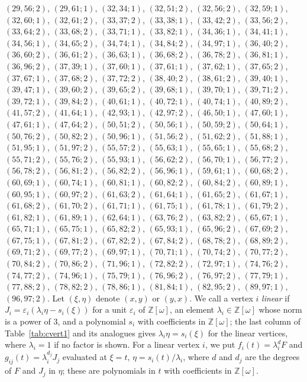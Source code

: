 \documentclass[11pt]{article}
\newcommand{\Z}{\mathbb{Z}}
\begin{document}
$(29,56;2)$, $(29,61;1)$, $(32,34;1)$, $(32,51;2)$, $(32,56;2)$, $(32,59;1)$, $(32,60;1)$, $(32,61;2)$, $(33,37;2)$, $(33,38;1)$, $(33,42;2)$, $(33,56;2)$, $(33,64;2)$, $(33,68;2)$, $(33,71;1)$, $(33,82;1)$, $(34,36;1)$, $(34,41;1)$, $(34,56;1)$, $(34,65;2)$, $(34,74;1)$, $(34,84;2)$, $(34,97;1)$, $(36,40;2)$, $(36,60;2)$, $(36,61;2)$, $(36,63;1)$, $(36,68;2)$, $(36,78;2)$, $(36,81;1)$, $(36,96;2)$, $(37,39;1)$, $(37,60;1)$, $(37,61;1)$, $(37,62;1)$, $(37,65;2)$, $(37,67;1)$, $(37,68;2)$, $(37,72;2)$, $(38,40;2)$, $(38,61;2)$, $(39,40;1)$, $(39,47;1)$, $(39,60;2)$, $(39,65;2)$, $(39,68;1)$, $(39,70;1)$, $(39,71;2)$, $(39,72;1)$, $(39,84;2)$, $(40,61;1)$, $(40,72;1)$, $(40,74;1)$, $(40,89;2)$, $(41,57;2)$, $(41,64;1)$, $(42,93;1)$, $(42,97;2)$, $(46,50;1)$, $(47,60;1)$, $(47,61;1)$, $(47,64;2)$, $(50,51;2)$, $(50,56;1)$, $(50,59;2)$, $(50,64;1)$, $(50,76;2)$, $(50,82;2)$, $(50,96;1)$, $(51,56;2)$, $(51,62;2)$, $(51,88;1)$, $(51,95;1)$, $(51,97;2)$, $(55,57;2)$, $(55,63;1)$, $(55,65;1)$, $(55,68;2)$, $(55,71;2)$, $(55,76;2)$, $(55,93;1)$, $(56,62;2)$, $(56,70;1)$, $(56,77;2)$, $(56,78;2)$, $(56,81;2)$, $(56,82;2)$, $(56,96;1)$, $(59,61;1)$, $(60,68;2)$, $(60,69;1)$, $(60,74;1)$, $(60,81;1)$, $(60,82;2)$, $(60,84;2)$, $(60,89;1)$, $(60,95;1)$, $(60,97;2)$, $(61,63;2)$, $(61,64;1)$, $(61,65;2)$, $(61,67;1)$, $(61,68;2)$, $(61,70;2)$, $(61,71;1)$, $(61,75;1)$, $(61,78;1)$, $(61,79;2)$, $(61,82;1)$, $(61,89;1)$, $(62,64;1)$, $(63,76;2)$, $(63,82;2)$, $(65,67;1)$, $(65,71;1)$, $(65,75;1)$, $(65,82;2)$, $(65,93;1)$, $(65,96;2)$, $(67,69;2)$, $(67,75;1)$, $(67,81;2)$, $(67,82;2)$, $(67,84;2)$, $(68,78;2)$, $(68,89;2)$, $(69,71;2)$, $(69,77;2)$, $(69,97;1)$, $(70,71;1)$, $(70,74;2)$, $(70,77;2)$, $(70,84;2)$, $(70,86;2)$, $(71,96;1)$, $(72,82;2)$, $(72,97;1)$, $(74,76;2)$, $(74,77;2)$, $(74,96;1)$, $(75,79;1)$, $(76,96;2)$, $(76,97;2)$, $(77,79;1)$, $(77,88;2)$, $(78,82;2)$, $(78,86;1)$, $(81,84;1)$, $(82,95;2)$, $(89,97;1)$, $(96,97;2)$.
Let $(\xi,\eta)$ denote $(x,y)$ or $(y,x)$. We call a vertex $i$ \emph{linear} if $J_i=\varepsilon_i(\lambda_i\eta-s_i(\xi))$ for a unit $\varepsilon_i$ of $\Z[\omega]$, an element $\lambda_i\in\Z[\omega]$ whose norm is a power of $3$, and a polynomial $s_i$ with coefficients in $\Z[\omega]$; the last column of Table~\ref{tab:cvert1} and its analogues gives $\lambda_i\eta=s_i(\xi)$ for the linear vertices, where $\lambda_i=1$ if no factor is shown. For a linear vertex $i$, we put $f_i(t)=\lambda_i^{d}F$ and $g_{ij}(t)=\lambda_i^{d_j}J_j$ evaluated at $\xi=t$, $\eta=s_i(t)/\lambda_i$, where $d$ and $d_j$ are the degrees of $F$ and $J_j$ in $\eta$; these are polynomials in $t$ with coefficients in $\Z[\omega]$.
\end{document}
